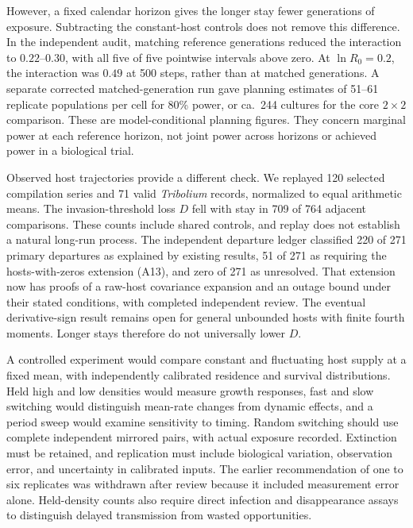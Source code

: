 However, a fixed calendar horizon gives the longer stay fewer generations of
exposure. Subtracting the constant-host controls does not remove this difference.
In the independent audit, matching reference generations reduced the interaction
to $0.22$--$0.30$, with all five of five pointwise intervals above zero.
At $\ln R_0=0.2$, the interaction was $0.49$ at 500 steps, rather than at
matched generations.
A separate corrected matched-generation run gave planning estimates of 51--61
replicate populations per cell for 80\% power, or ca.\ 244 cultures for the
core $2\times2$ comparison. These are model-conditional planning figures.
They concern marginal power at each reference horizon, not joint power
across horizons or achieved power in a biological trial.

Observed host trajectories provide a different check. We replayed 120 selected
compilation series and 71 valid \textit{Tribolium} records, normalized to equal
arithmetic means. The invasion-threshold loss $D$ fell with stay in 709 of 764
adjacent comparisons. These counts include shared controls, and replay does not
establish a natural long-run process. The independent departure ledger classified
220 of 271 primary departures as explained by existing results, 51 of 271 as
requiring the hosts-with-zeros extension (A13), and zero of 271 as unresolved.
That extension now has proofs of a raw-host covariance expansion and an outage
bound under their stated conditions, with completed independent review.
The eventual derivative-sign result remains open for general unbounded hosts
with finite fourth moments. Longer stays therefore do not universally lower $D$.

A controlled experiment would compare constant and fluctuating host supply at a
fixed mean, with independently calibrated residence and survival distributions.
Held high and low densities would measure growth responses, fast and slow
switching would distinguish mean-rate changes from dynamic effects, and a period
sweep would examine sensitivity to timing. Random switching should use complete
independent mirrored pairs, with actual exposure recorded. Extinction must be
retained, and replication must include biological variation, observation error,
and uncertainty in calibrated inputs.
The earlier recommendation of one to six replicates was withdrawn after
review because it included measurement error alone. Held-density counts
also require direct infection and disappearance assays to distinguish
delayed transmission from wasted opportunities.

